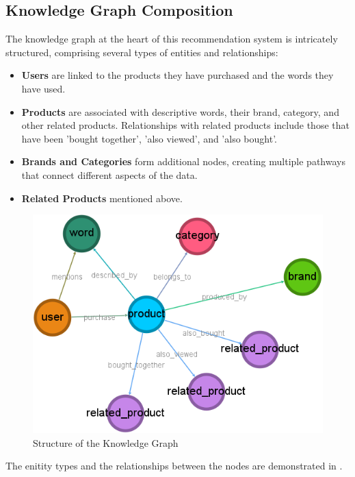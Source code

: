 \subsection{Knowledge Graph Composition}
The knowledge graph at the heart of this recommendation system is intricately structured,
comprising several types of entities and relationships:
\begin{itemize}
	\item \textbf{Users} are linked to the products
	      they have purchased and the words they have used.

	\item \textbf{Products} are associated with descriptive words, their brand,
	      category, and other related products. Relationships with related products
	      include those that have been 'bought together', 'also viewed', and 'also bought'.

	\item \textbf{Brands and Categories} form additional nodes, creating multiple pathways
	      that connect different aspects of the data.

	\item \textbf{Related Products} mentioned above.
\end{itemize}
\begin{figure}[h!]
	\begin{center}
		\includegraphics[width=0.6\columnwidth, keepaspectratio]{images/knowledge_graph_structure.png}
		\caption{Structure of the Knowledge Graph}
		\label{fig:knowledge_graph_structure}
	\end{center}
\end{figure}
The enitity types and the relationships between the nodes are demonstrated in
.

